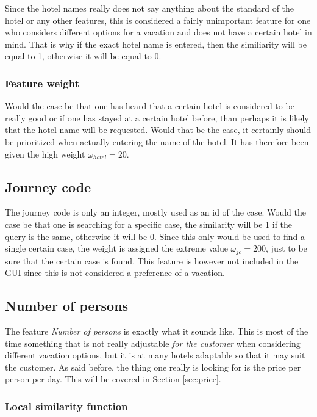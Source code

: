 \documentclass[12pt]{article}
\begin{document}
Since the hotel names really does not say anything about the standard of the hotel or any other features, this is considered a fairly unimportant feature for one who considers different options for a vacation and does not have a certain hotel in mind. That is why if the exact hotel name is entered, then the similiarity will be equal to 1, otherwise it will be equal to 0. 

\subsubsection{Feature weight}
\label{sec:hotel-weight}

Would the case be that one has heard that a certain hotel is considered to be really good or if one has stayed at a certain hotel before, than perhaps it is likely that the hotel name will be requested. Would that be the case, it certainly should be prioritized when actually entering the name of the hotel. It has therefore been given the high weight $\omega_{hotel}=20$. 

\subsection{Journey code}
\label{sec:jc}

The journey code is only an integer, mostly used as an id of the case. Would the case be that one is searching for a specific case, the similarity will be 1 if the query is the same, otherwise it will be 0. Since this only would be used to find a single certain case, the weight is assigned the extreme value $\omega_{jc}=200$, just to be sure that the certain case is found. This feature is however not included in the GUI since this is not considered a preference of a vacation. 

\subsection{Number of persons}
\label{sec:nop}

The feature \textit{Number of persons} is exactly what it sounds like. This is most of the time something that is not really adjustable \textit{for the customer} when considering different vacation options, but it is at many hotels adaptable so that it may suit the customer. As said before, the thing one really is looking for is the price per person per day. This will be covered in Section \ref{sec:price}. 

\subsubsection{Local similarity function}
\label{sec:nop-sim}
\end{document}
